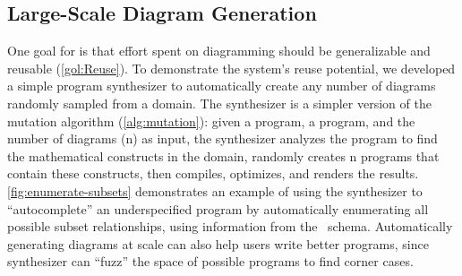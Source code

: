 


\subsection{Large-Scale Diagram Generation}
\label{sec:LargeScaleDiagramGeneration}

One goal for \Penrose{} is that effort spent on diagramming should be generalizable and reusable (\ref{gol:Reuse}). To demonstrate the system's reuse potential, we developed a simple program synthesizer to automatically create any number of diagrams randomly sampled from a domain. The synthesizer is a simpler version of the \Edgeworth mutation algorithm (\cref{alg:mutation}): given a \Domain{} program, a \Style{} program, and the number of diagrams (\textsf{n}) as input, the synthesizer analyzes the \Domain{} program to find the mathematical constructs in the domain, randomly creates \textsf{n} \Substance{} programs that contain these constructs, then compiles, optimizes, and renders the results. \cref{fig:enumerate-subsets} demonstrates an example of using the synthesizer to ``autocomplete'' an underspecified \Substance{} program by automatically enumerating all possible subset relationships, using information from the \Domain\ schema. Automatically generating diagrams at scale can also help users write better \Style{} programs, since synthesizer can ``fuzz'' the space of possible \Substance{} programs to find corner cases.

